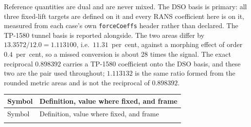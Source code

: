 \documentclass[10pt,a4paper]{article}
\begin{document}
Reference quantities are dual and are never mixed. The DSO basis is primary: all three fixed-lift
targets are defined on it and every RANS coefficient here is on it, measured from each case's own
\texttt{forceCoeffs} header rather than declared. The TP-1580 tunnel basis is reported alongside.
The two areas differ by $13.3572/12.0 = \num{1.113100}$, i.e.\ $11.31$~per~cent, against a
morphing effect of order $0.4$~per~cent, so a missed conversion is about 28 times the signal. The
exact reciprocal $\num{0.898392}$ carries a TP-1580 coefficient onto the DSO basis, and these two
are the pair used throughout; $\num{1.113132}$ is the same ratio formed from the rounded metric
areas and is not the reciprocal of $\num{0.898392}$.

{\footnotesize
\begin{longtable}{@{}p{}p{}@{}}
\toprule
Symbol & Definition, value where fixed, and frame \\
\midrule
\endfirsthead
\toprule
Symbol & Definition, value where fixed, and frame \\
\midrule
\endhead
\bottomrule
\endlastfoot


\end{longtable}}
\end{document}
